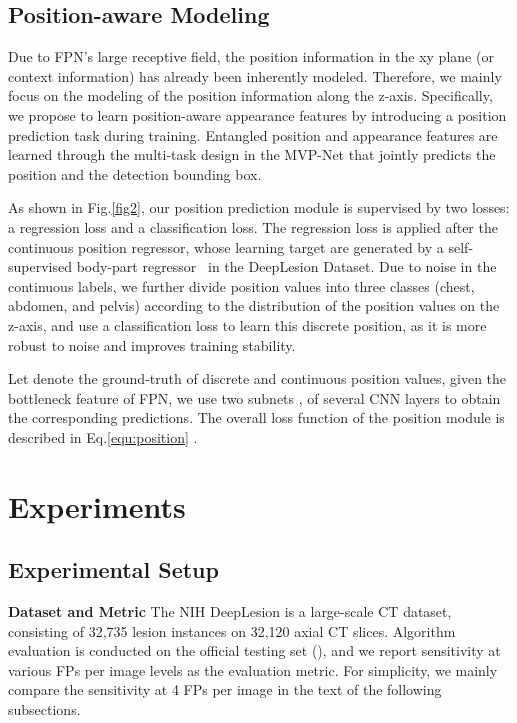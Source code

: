 \documentclass[runningheads]{llncs}
\begin{document}
\subsection{Position-aware Modeling}

Due to FPN's large receptive field, the position information in the xy plane  (or context information) has already been inherently modeled. Therefore, we mainly focus on the modeling of the position information along the z-axis. Specifically, we propose to learn position-aware appearance features by introducing a position prediction task during training. Entangled position and appearance features are learned through the multi-task design in the MVP-Net that jointly predicts the position and the detection bounding box. 








As shown in Fig.\ref{fig2}, our position prediction module is supervised by two losses: a regression loss and a classification loss. The regression loss is applied after the continuous position regressor, whose learning target are generated by a self-supervised body-part regressor~\cite{UBPR} in the DeepLesion Dataset\cite{DeepLesion}. Due to noise in the continuous labels, we further divide position values into three classes (chest, abdomen, and pelvis) according to the distribution of the position values on the z-axis, and use a classification loss to learn this discrete position, as it is more robust to noise and improves training stability.

Let \bm{} denote the ground-truth of discrete and continuous position values, given the bottleneck feature \bm{} of FPN, we use two subnets \bm{}, \bm{} of several CNN layers to obtain the corresponding predictions. The overall loss function of the position module is described in Eq.\ref{equ:position} .









\section{Experiments}

\subsection{Experimental Setup}


\noindent\textbf{Dataset and Metric} The NIH DeepLesion\cite{DeepLesion} is a large-scale CT dataset, consisting of 32,735 lesion instances on 32,120 axial CT slices. Algorithm evaluation is conducted on the official testing set (), and we report sensitivity at various FPs per image levels as the evaluation metric. For simplicity, we mainly compare the sensitivity at 4 FPs per image in the text of the following subsections.
\end{document}

